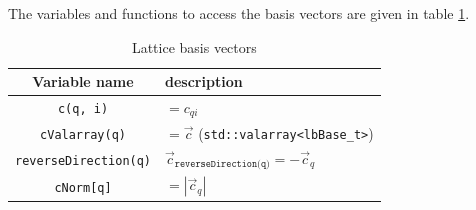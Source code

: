 \documentclass[11pt,a4paper]{report}
\begin{document}
The variables and functions to access the basis vectors are given in table \ref{tab:lattice basis vector}.
\begin{table}
	\centering
	\begin{tabular}{|c|l|}\hline
		Variable name & description \\ \hline
		\texttt{c(q, i)} & $=c_{qi}$ \\ 
		\texttt{cValarray(q)} & $=\vec{c}$ (\texttt{std::valarray<lbBase{\_t}>}) \\ 		
		\texttt{reverseDirection(q)} & $\vec{c}_{\texttt{reverseDirection(q)}} = -\vec{c}_{q}$ \\ \hline 
		\texttt{cNorm[q]} & $=|\vec{c}_q|$ \\ \hline
	\end{tabular}
	\caption{Lattice basis vectors}
	\label{tab:lattice basis vector}
\end{table}
\end{document}
